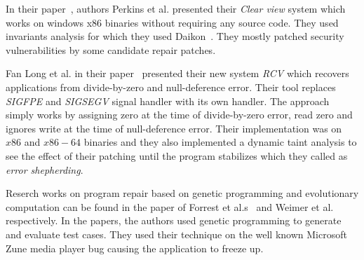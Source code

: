 {
% 
In their paper~\cite{conf/sosp/PerkinsKLABCPSSSWZER09}, authors Perkins et al.
presented their \emph{Clear view} system which works on windows x86 binaries
without requiring any source code. They used invariants analysis for which
they used Daikon~\cite{DBLP:journals/scp/ErnstPGMPTX07}. They mostly patched
security vulnerabilities by some candidate repair patches.

Fan Long et al. in their paper~\cite{conf/pldi/LongSR14} presented their new
system \emph{RCV} which recovers applications from divide-by-zero and
null-deference error. Their tool replaces \emph{SIGFPE} and \emph{SIGSEGV}
signal handler with its own handler. The approach simply works by assigning zero
at the time of divide-by-zero error, read zero and ignores write at the time of
null-deference error. Their implementation was on $x86$ and $x86-64$ binaries
and they also implemented a dynamic taint analysis to see the effect of
their
patching until the program stabilizes which they called as \emph{error
shepherding}.

% 
Reserch works on program repair based on genetic programming and evolutionary
computation can be found in the paper of Forrest
et al.s~\cite{conf/gecco/2009g} and Weimer
et al.~\cite{DBLP:journals/cacm/WeimerFGN10} respectively. In the papers, the
authors used genetic programming to generate and evaluate test cases. They used their
technique on the well known Microsoft Zune media player bug causing the
application to freeze up.
}



